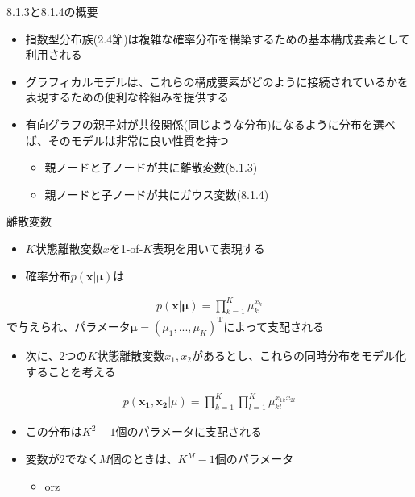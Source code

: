 \begin{frame}{8.1.3と8.1.4の概要}
 \begin{itemize}
  \item 指数型分布族(2.4節)は複雑な確率分布を構築するための基本構成要素として利用される
  \item グラフィカルモデルは、これらの構成要素がどのように接続されているかを表現するための便利な枠組みを提供する
  \item 有向グラフの親子対が共役関係(同じような分布)になるように分布を選べば、そのモデルは非常に良い性質を持つ
        \begin{itemize}
         \item 親ノードと子ノードが共に\alert{離散変数}(8.1.3)
         \item 親ノードと子ノードが共に\alert{ガウス変数}(8.1.4)
        \end{itemize}
 \end{itemize}
\end{frame}

\begin{frame}{離散変数}
 \begin{itemize}
  \item $K$状態離散変数$x$を1-of-$K$表現を用いて表現する
  \item 確率分布$p(\bm{x}|\bm{\mu})$は
 \end{itemize}
 \begin{eqnarray*}
  p(\bm{x}|\bm{\mu}) = \prod_{k=1}^{K}\mu_k^{x_k}
 \end{eqnarray*}
 で与えられ、パラメータ$\bm{\mu}=(\mu_1,...,\mu_K)^{\mathrm{T}}$によって支配される
 \begin{itemize}
  \item 次に、2つの$K$状態離散変数$x_1,x_2$があるとし、これらの同時分布をモデル化することを考える
 \end{itemize}
 \begin{eqnarray*}
  p(\bm{x_1},\bm{x_2}|\mu) = \prod_{k=1}^{K}\prod_{l=1}^{K}\mu_{kl}^{x_{1k}x_{2l}}
 \end{eqnarray*}
 \begin{itemize}
  \item この分布は$K^2-1$個のパラメータに支配される
  \item 変数が2でなく$M$個のときは、$K^M-1$個のパラメータ
        \begin{itemize}
         \item {}orz
        \end{itemize}
 \end{itemize}
\end{frame}

